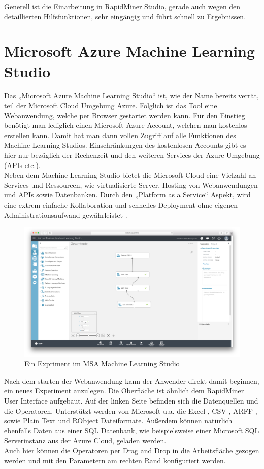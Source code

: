 Generell ist die Einarbeitung in RapidMiner Studio, gerade auch wegen den
detaillierten Hilfsfunktionen, sehr eingängig und führt schnell zu Ergebnissen.

\pagebreak

\section{Microsoft Azure Machine Learning Studio}
\label{sec:software:msa}

Das „Microsoft Azure Machine Learning Studio“ ist, wie der Name bereits verrät,
teil der Microsoft Cloud Umgebung Azure. Folglich ist das Tool eine Webanwendung,
welche per Browser gestartet werden kann.  Für den Einstieg benötigt man
lediglich einen Microsoft Azure Account, welchen man kostenlos erstellen kann.
Damit hat man dann vollen Zugriff auf alle Funktionen des Machine Learning
Studios. Einschränkungen des kostenlosen Accounts gibt es hier nur bezüglich
der Rechenzeit und den weiteren Services der Azure Umgebung (APIs etc.). \\
Neben dem Machine Learning Studio bietet die Microsoft Cloud eine Vielzahl an
Services und Ressourcen, wie virtualisierte Server, Hosting von Webanwendungen
und APIs sowie Datenbanken. Durch den „Platform as a Service“ Aspekt, wird eine
extrem einfache Kollaboration und schnelles Deployment ohne eigenen
Administrationsaufwand gewährleistet \cite{MSA:15}.

\begin{figure}[htb]
	\includegraphics[width=\textwidth]{gfx/ml1.png}
	\caption{Ein Expriment im MSA Machine Learning Studio}
	\label{fig:software:ml:des}
\end{figure}

Nach dem starten der Webanwendung kann der Anwender direkt damit beginnen, ein
neues Experiment anzulegen. Die Oberfläche ist ähnlich dem RapidMiner User
Interface aufgebaut. Auf der linken Seite befinden sich die Datenquellen und
die Operatoren. Unterstützt werden von Microsoft u.a. die Excel-, CSV-, ARFF-,
sowie Plain Text und RObject Dateiformate. Außerdem können natürlich ebenfalls
Daten aus einer SQL Datenbank, wie beispielsweise einer Microsoft SQL
Serverinstanz aus der Azure Cloud, geladen werden. \\
Auch hier können die Operatoren per Drag and Drop in die Arbeitsfläche gezogen
werden und mit den Parametern am rechten Rand konfiguriert werden.

